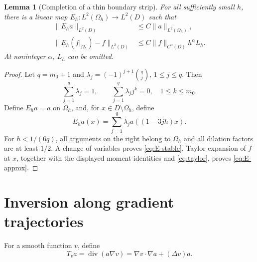 \documentclass[11pt]{article}
\newtheorem{lemma}[theorem]{Lemma}
\theoremstyle{remark}
\DeclareMathOperator{\divergence}{div}
\begin{document}
\begin{lemma}[Completion of a thin boundary strip]\label{lem:extension}
For all sufficiently small \(h\), there is a linear map
\(E_h:L^2(\Omega_h)\to L^2(D)\) such that
\begin{align}
\|E_h a\|_{L^2(D)}&\leq C\|a\|_{L^2(\Omega_h)},\label{eq:E-stable}\\
\|E_h(f|_{\Omega_h})-f\|_{L^2(D)}
&\leq C\|f\|_{C^\alpha(D)}h^\alpha L_h.
\label{eq:E-approx}
\end{align}
At noninteger \(\alpha\), \(L_h\) can be omitted.
\end{lemma}

\begin{proof}
Let \(q=m_0+1\) and
\(\lambda_j=(-1)^{j+1}\binom qj\), \(1\leq j\leq q\).
Then
\[
\sum_{j=1}^q\lambda_j=1,\qquad
\sum_{j=1}^q\lambda_j j^k=0,\quad 1\leq k\leq m_0.
\]
Define \(E_h a=a\) on \(\Omega_h\), and, for \(x\in D\setminus\Omega_h\),
define
\[
E_h a(x)=\sum_{j=1}^q\lambda_j a((1-3jh)x).
\]
For \(h<1/(6q)\), all arguments on the right belong to \(\Omega_h\)
and all dilation factors are at least \(1/2\).
A change of variables proves \eqref{eq:E-stable}.
Taylor expansion of \(f\) at \(x\), together with the displayed
moment identities and \eqref{eq:taylor}, proves
\eqref{eq:E-approx}.
\end{proof}

\section{Inversion along gradient trajectories}

For a smooth function \(v\), define
\[
T_v a=\divergence(a\nabla v)
=\nabla v\cdot\nabla a+(\Delta v)a.
\]
\end{document}
